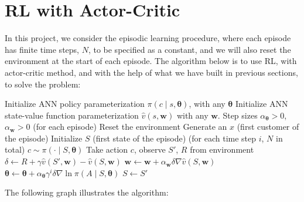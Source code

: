 \documentclass[11pt]{article}
\begin{document}
\section{RL with Actor-Critic}
In this project, we consider the episodic learning procedure, where each 
episode has finite time steps, \(N\), to be specified as a constant, and we 
will also reset the environment at the start of each episode. The algorithm 
below is to use RL, with actor-critic method, and with the help of what we 
have built in previous sections, to solve the problem:
\begin{algorithm}[H]
\caption{RL-Actor-Critic-for-financial-problem}
\begin{algorithmic}[1]
\State Initialize ANN policy parameterization 
\(\pi\left(c\middle|s, \bm{\theta}\right)\), with any \(\bm{\theta}\)
\State Initialize ANN state-value function parameterization
\(\hat{v}(s,\bm{w})\) with any \(\bm{w}\).
\State Step sizes \(\alpha_{\bm{\theta}}>0\), \(\alpha_{\bm{w}}>0\)
\Loop \hspace{0.3mm} (for each episode)
    \State Reset the environment
    \State Generate an \(x\) (first customer of the episode)
    \State Initialize \(S\) (first state of the episode)
    \Loop \hspace{0.3mm} (for each time step \(i\), \(N\) in total)
        \State \(c\sim\pi\left(\cdot\middle|S, \bm{\theta}\right)\)
        \State Take action \(c\), observe \(S'\), \(R\) from environment
        \State \(\delta \gets R + \gamma\hat{v}(S',\bm{w})-\hat{v}(S,\bm{w})\)
        \State \(\bm{w} \gets \bm{w} + 
        \alpha_{\bm{w}} \delta\nabla\hat{v}(S,\bm{w})\)
        \State \(\bm{\theta} \gets \bm{\theta} 
        + \alpha_{\bm{\theta}}\gamma^{i}\delta
        \nabla\ln{\pi\left(A\middle|S, \bm{\theta}\right)}\)
        \State \(S \gets S'\)
    \EndLoop
\EndLoop
\end{algorithmic}
\end{algorithm}
\noindent The following graph illustrates the algorithm:
\vspace{5mm}
\end{document}
